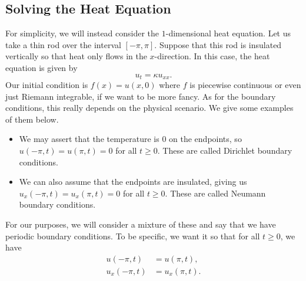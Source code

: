 \subsection{Solving the Heat Equation}
For simplicity, we will instead consider the $1$-dimensional heat equation. 
Let us take a thin rod over the interval $[-\pi, \pi]$. Suppose that this 
rod is insulated vertically so that heat only flows in the $x$-direction. 
In this case, the heat equation is given by 
\[ u_t = \kappa u_{xx}. \] 
Our initial condition is $f(x) = u(x, 0)$ where $f$ is piecewise continuous
or even just Riemann integrable, if we want to be more fancy. As for the 
boundary conditions, this really depends on the physical scenario. We give 
some examples of them below.
\begin{itemize}
    \item We may assert that the temperature is $0$ on the endpoints, so
    $u(-\pi, t) = u(\pi, t) = 0$ for all $t \geq 0$. These are called 
    Dirichlet boundary conditions.
    \item We can also assume that the endpoints are insulated, giving us 
    $u_x(-\pi, t) = u_x(\pi, t) = 0$ for all $t \geq 0$. These are called 
    Neumann boundary conditions.
\end{itemize}
For our purposes, we will consider a mixture of these and say that we have 
periodic boundary conditions. To be specific, we want it so that for all 
$t \geq 0$, we have 
\begin{align*}
    u(-\pi, t) &= u(\pi, t), \\ 
    u_x(-\pi, t) &= u_x(\pi, t).
\end{align*}
